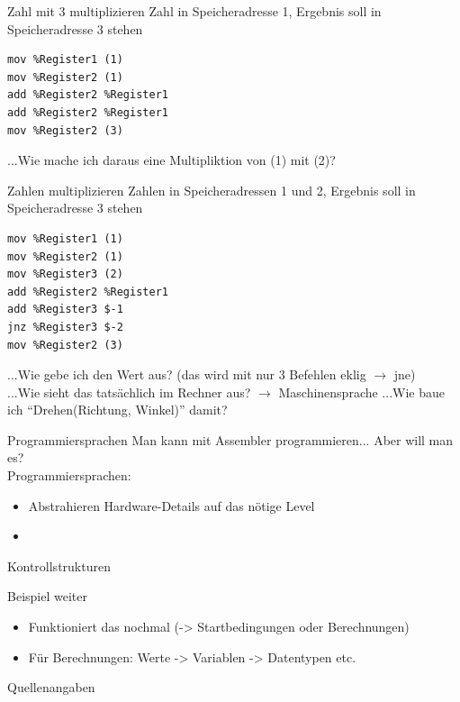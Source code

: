 \documentclass[aspectratio=169,t]{beamer}
\begin{document}
\begin{frame}[t,fragile]{Zahl mit 3 multiplizieren}
	Zahl in Speicheradresse 1, Ergebnis soll in Speicheradresse 3 stehen
	\lstset{language=[x86masm]Assembler,texcl=true}
	\begin{lstlisting}
mov %Register1 (1)
mov %Register2 (1)
add %Register2 %Register1
add %Register2 %Register1
mov %Register2 (3)
	\end{lstlisting}
	...Wie mache ich daraus eine Multipliktion von (1) mit (2)?
\end{frame}

\begin{frame}[t,fragile]{Zahlen multiplizieren}
	Zahlen in Speicheradressen 1 und 2, Ergebnis soll in Speicheradresse 3 stehen
	\lstset{language=[x86masm]Assembler,texcl=true}
	\begin{lstlisting}
mov %Register1 (1)
mov %Register2 (1)
mov %Register3 (2)
add %Register2 %Register1
add %Register3 $-1
jnz %Register3 $-2
mov %Register2 (3)
	\end{lstlisting}
	...Wie gebe ich den Wert aus? (das wird mit nur 3 Befehlen eklig $\rightarrow$ jne)\\
	...Wie sieht das tatsächlich im Rechner aus? $\rightarrow$ Maschinensprache
	...Wie baue ich ``Drehen(Richtung, Winkel)'' damit?
\end{frame}

\begin{frame}{Programmiersprachen}
	Man kann mit Assembler programmieren... Aber will man es?
	\\Programmiersprachen:
	\begin{itemize}
		\item Abstrahieren Hardware-Details auf das nötige Level
		\item 
	\end{itemize}
\end{frame}

\begin{frame}{Kontrollstrukturen}
\end{frame}

\begin{frame}{Beispiel weiter}
	\begin{itemize}
		\item Funktioniert das nochmal (-> Startbedingungen oder Berechnungen)
		\item Für Berechnungen: Werte -> Variablen -> Datentypen etc.
	\end{itemize}
\end{frame}

\begin{frame}[allowframebreaks]{Quellenangaben}
    \printbibliography
\end{frame}


\end{document}
